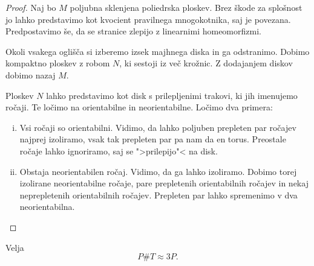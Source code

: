 \begin{proof}
Naj bo $M$ poljubna sklenjena poliedrska ploskev. Brez škode za
splošnost jo lahko predstavimo kot kvocient pravilnega
mnogokotnika, saj je povezana. Predpostavimo še, da se stranice
zlepijo z linearnimi homeomorfizmi.

Okoli vsakega oglišča si izberemo izsek majhnega diska in ga
odstranimo. Dobimo kompaktno ploskev z robom $N$, ki sestoji iz več
krožnic. Z dodajanjem diskov dobimo nazaj $M$.

Ploskev $N$ lahko predstavimo kot disk s prilepljenimi trakovi, ki
jih imenujemo ročaji. Te ločimo na orientabilne in neorientabilne.
Ločimo dva primera:

\begin{enumerate}[i)]
\item Vsi ročaji so orientabilni. Vidimo, da lahko poljuben
prepleten par ročajev najprej izoliramo, vsak tak prepleten par pa
nam da en torus. Preostale ročaje lahko ignoriramo, saj se
">prilepijo"< na disk.
\item Obstaja neorientabilen ročaj. Vidimo, da ga lahko izoliramo.
Dobimo torej izolirane neorientabilne ročaje, pare prepletenih
orientabilnih ročajev in nekaj neprepletenih orientabilnih ročajev.
Prepleten par lahko spremenimo v dva neorientabilna. \qedhere
\end{enumerate}
\end{proof}

\begin{opomba}
Velja
\[
P \# T \approx 3 P.
\]
\end{opomba}
